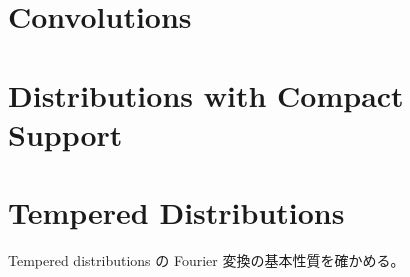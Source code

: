 \documentclass[report]{jlreq}
\begin{document}
%
\section{Convolutions}

%
\section{Distributions with Compact Support}

%
\section{Tempered Distributions}

Tempered distributions の Fourier 変換の基本性質を確かめる。
\end{document}
